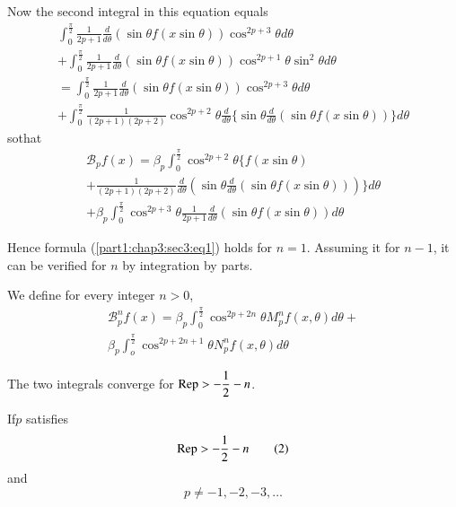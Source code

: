 Now the second integral in this equation equals
\begin{multline*}
  \int^{\frac{\pi}{2}}_{0}\frac{1}{2p+1} \frac{d}{d \theta }  ( \sin
  \theta  f (x \sin \theta  )) \cos^{2p+3} \theta  d  \theta  \\ 
  +  \int^{\frac{\pi}{2}}_{0}\frac{1}{2p+1} \frac{d}{d \theta }  ( \sin
  \theta  f (x \sin \theta  )) \cos^{2p+1} \theta  \sin^2 \theta  d
  \theta \\ 
  = \int^{\frac{\pi}{2}}_{0}\frac{1}{2p+1} \frac{d}{d \theta }  ( \sin
  \theta  f (x \sin \theta  )) \cos^{2p+3} \theta  d \theta  \\ 
  +  \int^{\frac{\pi}{2}}_{0}\frac{1}{(2p+1)(2p+2)}\cos^{2p + 2}\theta 
  \frac{d}{d \theta } \bigg\{  \sin \theta  \frac{d}{d \theta } ( \sin
  \theta  f( x \sin \theta  ))\bigg\} d \theta  
\end{multline*}
so\pageoriginale that
\begin{multline*}
  \mathscr{B}_pf(x) = \beta_p \int^{\frac{\pi}{2}}_{0} \cos^{2p +2}
  \theta  \bigg\{f (x \sin \theta  )\\ 
  + \frac{1}{(2p+1)(2p+2)}\frac{d}{d
    \theta }(\sin \theta  \frac{d}{d \theta } (\sin \theta  f (x \sin
  \theta  )))\bigg\} d \theta \\ 
  + \beta_p \int^{\frac{\pi}{2}}_{0} \cos^{2p+3} \theta  \frac{1}{2p+1}
  \frac{d}{d \theta }  ( \sin \theta  f (x \sin \theta  ))  d \theta  
\end{multline*}

Hence formula (\ref{part1:chap3:sec3:eq1}) holds for $n=1$. Assuming it for $n-1$, it can be
verified for $n$ by integration by parts. 

We define for every integer $n > 0$,
\begin{multline*}
  \mathscr{B}^n _p f (x) = \beta_p \int^{\frac{\pi}{2}}_{0} \cos^{2p +
    2n} \theta  M^n_p f (x, \theta  ) d \theta  +\\ 
  \beta_p \int^{ \frac{\pi}{2}}_{o} \cos^{2p+2n+1} \theta  N^n_p f (x,
  \theta  )d \theta  
\end{multline*}

The two integrals converge for $\operatorname{Rep} > - \dfrac{1}{2}- n$.

\begin{proposition}\label{part1:chap3:sec3:prop2}%
  If\pageoriginale $p$ satisfies
  \begin{equation*}
    \operatorname{Rep} > - \frac{1}{2}- n \tag{2}\label{part1:chap3:sec3:eq2}
  \end{equation*}
    and
  \begin{equation*}  
    p \neq -1, -2, -3, \ldots \tag{3}\label{part1:chap3:sec3:eq3}
  \end{equation*}
\end{proposition}

